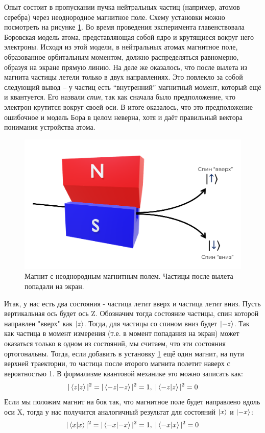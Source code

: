 Опыт состоит в пропускании пучка нейтральных частиц (например, атомов серебра) через неоднородное магнитное поле. Схему установки можно посмотреть на рисунке \ref{fig B.1}. Во время проведения эксперимента главенствовала Боровская модель атома, представляющая собой ядро и крутящиеся вокруг него электроны. Исходя из этой модели, в нейтральных атомах магнитное поле, образованное орбитальным моментом, должно распределяться равномерно, образуя на экране прямую линию. На деле же оказалось, что после вылета из магнита частицы летели только в двух направлениях. Это повлекло за собой следующий вывод -- у частиц есть ``внутренний'' магнитный момент, который ещё и квантуется. Его назвали \textit{спин}, так как сначала было предположение, что электрон крутится вокруг своей оси. В итоге оказалось, что это предположение ошибочное и модель Бора в целом неверна, хотя и даёт правильный вектора понимания устройства атома.
\begin{figure}[h!]
\centering
\includegraphics[scale=0.4]{appendix/images/gc.png}
\caption{Магнит с неоднородным магнитным полем. Частицы после вылета попадали на экран.}
\label{fig B.1}
\end{figure}

Итак, у нас есть два состояния - частица летит вверх и частица летит вниз. Пусть вертикальная ось будет ось Z. Обозначим тогда состояние частицы, спин которой направлен "вверх" как $\ket{z}$. Тогда, для частицы со спином вниз будет $\ket{-z}$. Так как частица в момент измерения (т.е. в момент попадания на экран) может оказаться только в одном из состояний, мы считаем, что эти состояния ортогональны. Тогда, если добавить в установку \ref{fig B.1} ещё один магнит, на пути верхней траектории, то частица после второго магнита полетит наверх с вероятностью 1. В формализме квантовой механике это можно записать как:
\[
|\bra{z}\ket{z}|^2 = |\bra{-z}\ket{-z}|^2 = 1,\; |\bra{-z}\ket{z}|^2 = 0
\]
Если мы положим магнит на бок так, что магнитное поле будет направлено вдоль оси X, тогда у нас получится аналогичный результат для состояний $\ket{x}$ и $\ket{-x}$:
\[
|\bra{x}\ket{x}|^2 = |\bra{-x}\ket{-x}|^2 = 1,\;|\bra{-x}\ket{x}|^2 = 0
\]

